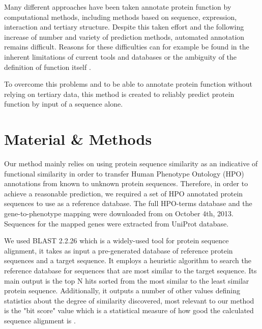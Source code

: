 \documentclass{bioinfo}
\begin{document}
Many different approaches have been taken annotate protein function by computational methods, including methods based on sequence, expression, interaction and tertiary structure. Despite this taken effort and the following increase of number and variety of prediction methods, automated annotation remains difficult. Reasons for these difficulties can for example be found in the inherent limitations of current tools and databases or the ambiguity of the definition of function itself \citep{Rodrigues07}.

To overcome this problems and to be able to annotate protein function without relying on tertiary data, this method is created to reliably predict protein function by input of a sequence alone.

%

\section{Material \& Methods}

Our method mainly relies on using protein sequence similarity as an indicative of functional similarity in order to transfer Human Phenotype Ontology (HPO) annotations from known to unknown protein sequences. Therefore, in order to achieve a reasonable prediction, we required a set of HPO annotated protein sequences to use as a reference database. The full HPO-terms database and the gene-to-phenotype mapping were downloaded from \cite{hpodb} on October 4th, 2013. Sequences for the mapped genes were extracted from UniProt \cite{uniprot} database.

We used BLAST 2.2.26 \cite{blastweb} which is a widely-used tool for protein sequence alignment, it takes as input a pre-generated database of reference protein sequences and a target sequence. It employs a heuristic algorithm to search the reference database for sequences that are most similar to the target sequence. Its main output is the top N hits sorted from the most similar to the least similar protein sequence. Additionally, it outputs a number of other values defining statistics about the degree of similarity discovered, most relevant to our method is the "bit score" value which is a statistical measure of how good the calculated sequence alignment is \cite{blastscore}.
\end{document}

